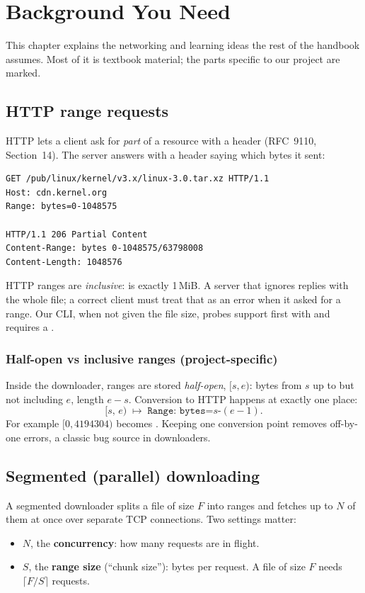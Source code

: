 \chapter{Background You Need}\label{ch:background}
This chapter explains the networking and learning ideas the rest of the handbook assumes. Most of it is textbook material; the parts specific to our project are marked.

\section{HTTP range requests}
HTTP lets a client ask for \emph{part} of a resource with a  header (RFC~9110, Section~14). The server answers  with a  header saying which bytes it sent:
\begin{lstlisting}
GET /pub/linux/kernel/v3.x/linux-3.0.tar.xz HTTP/1.1
Host: cdn.kernel.org
Range: bytes=0-1048575

HTTP/1.1 206 Partial Content
Content-Range: bytes 0-1048575/63798008
Content-Length: 1048576
\end{lstlisting}
HTTP ranges are \emph{inclusive}:  is exactly 1\,MiB. A server that ignores  replies  with the whole file; a correct client must treat that as an error when it asked for a range. Our CLI, when not given the file size, probes support first with  and requires a .

\subsection*{Half-open vs inclusive ranges (project-specific)}
Inside the downloader, ranges are stored \emph{half-open}, $[s, e)$: bytes from $s$ up to but not including $e$, length $e-s$. Conversion to HTTP happens at exactly one place:
\begin{equation}
[s,\,e) \;\longmapsto\; \texttt{Range: bytes=}s\texttt{-}(e-1).
\end{equation}
For example $[0, 4194304)$ becomes . Keeping one conversion point removes off-by-one errors, a classic bug source in downloaders.

\section{Segmented (parallel) downloading}
A segmented downloader splits a file of size $F$ into ranges and fetches up to $N$ of them at once over separate TCP connections. Two settings matter:
\begin{itemize}
\item $N$, the \textbf{concurrency}: how many requests are in flight.
\item $S$, the \textbf{range size} (``chunk size''): bytes per request. A file of size $F$ needs $\lceil F/S\rceil$ requests.
\end{itemize}

